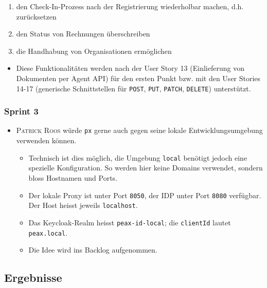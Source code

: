 \begin{itemize}
\begin{enumerate}
            \item den Check-In-Prozess nach der Registrierung wiederholbar machen, d.h. zurücksetzen
            \item den Status von Rechnungen überschreiben
            \item die Handhabung von Organisationen ermöglichen
        \end{enumerate}
        \begin{itemize}
            \item Diese Funktionalitäten werden nach der User Story 13 (Einlieferung von Dokumenten per Agent API) für den ersten Punkt bzw. mit den User Stories 14-17 (generische Schnittstellen für \texttt{POST}, \texttt{PUT}, \texttt{PATCH}, \texttt{DELETE}) unterstützt.
        \end{itemize}
\end{itemize}

\subsubsection{Sprint 3}

\begin{itemize}
    \item \textsc{Patrick Roos} würde \texttt{px} gerne auch gegen seine lokale Entwicklungsumgebung verwenden können.
        \begin{itemize}
            \item Technisch ist dies möglich, die Umgebung \texttt{local} benötigt jedoch eine spezielle Konfiguration. So werden hier keine Domains verwendet, sondern bloss Hostnamen und Ports.
            \item Der lokale Proxy ist unter Port \texttt{8050}, der IDP unter Port \texttt{8080} verfügbar. Der Host heisst jeweils \texttt{localhost}.
            \item Das Keycloak-Realm heisst \texttt{peax-id-local}; die \texttt{clientId} lautet \texttt{peax.local}.
            \item Die Idee wird ins Backlog aufgenommen.
        \end{itemize}
\end{itemize}

\subsection{Ergebnisse}

